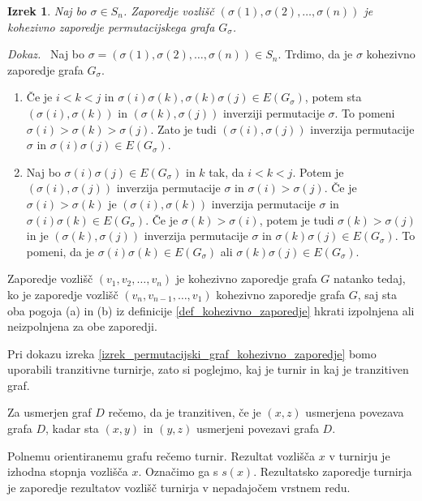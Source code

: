 \documentclass[a4paper, 12pt]{book}
\newtheorem{izrek}{Izrek}[chapter]
\newenvironment{dokaz}{\emph{Dokaz.}\ }{\hspace{\fill}{$\Box$}}
\begin{document}
\begin{izrek}
\label{izrek_sigma_kohezivno_zaporedje}
    Naj bo $\sigma \in S_n$. Zaporedje vozlišč $(\sigma(1), \sigma(2), \dots, \sigma(n))$ je kohezivno zaporedje permutacijskega grafa $G_{\sigma}$.
\end{izrek}
\begin{dokaz}
    Naj bo $\sigma = (\sigma(1), \sigma(2), \dots, \sigma(n)) \in S_n$. Trdimo, da je $\sigma$ kohezivno zaporedje grafa $G_{\sigma}$. 
    \begin{enumerate}[label=(\alph*)]
        \item Če je $i < k < j$ in $\sigma(i)\sigma(k), \sigma(k)\sigma(j) \in E(G_{\sigma})$, potem sta $(\sigma(i),\sigma(k))$ in $(\sigma(k),\sigma(j))$ inverziji permutacije $\sigma$. To pomeni $\sigma(i) > \sigma(k) > \sigma(j)$. Zato je tudi $(\sigma(i),\sigma(j))$ inverzija permutacije $\sigma$ in $\sigma(i)\sigma(j) \in E(G_{\sigma})$.        

        \item Naj bo $\sigma(i)\sigma(j) \in E(G_{\sigma})$ in $k$ tak, da $i < k < j$. Potem je $(\sigma(i),\sigma(j))$ inverzija permutacije $\sigma$ in $\sigma(i) > \sigma(j)$. Če je $\sigma(i) > \sigma(k)$ je $(\sigma(i),\sigma(k))$ inverzija permutacije $\sigma$ in $\sigma(i)\sigma(k) \in E(G_{\sigma})$. Če je $\sigma(k) > \sigma(i)$, potem je tudi $\sigma(k) > \sigma(j)$ in je $(\sigma(k), \sigma(j))$ inverzija permutacije $\sigma$ in $\sigma(k)\sigma(j) \in E(G_{\sigma})$. To pomeni, da je 
        $\sigma(i)\sigma(k) \in E(G_{\sigma})$ ali $\sigma(k)\sigma(j) \in E(G_{\sigma})$.
    \end{enumerate}
\end{dokaz}

Zaporedje vozlišč $(v_1, v_2, \dots, v_n)$ je kohezivno zaporedje grafa $G$ natanko tedaj, ko je zaporedje vozlišč $(v_n, v_{n-1}, \dots, v_1)$ kohezivno zaporedje grafa $G$, saj sta oba pogoja (a) in (b) iz definicije \ref{def_kohezivno_zaporedje} hkrati izpolnjena ali neizpolnjena za obe zaporedji.

Pri dokazu izreka \ref{izrek_permutacijski_graf_kohezivno_zaporedje} bomo uporabili tranzitivne turnirje, zato si poglejmo, kaj je turnir in kaj je tranzitiven graf.

Za usmerjen graf $D$ rečemo, da je tranzitiven, če je $(x, z)$ usmerjena povezava grafa $D$, kadar sta $(x, y)$ in $(y, z)$ usmerjeni povezavi grafa $D$. 

Polnemu orientiranemu grafu rečemo turnir. Rezultat vozlišča $x$ v turnirju je izhodna stopnja vozlišča $x$. Označimo ga s $s(x)$. Rezultatsko zaporedje turnirja je zaporedje rezultatov vozlišč turnirja v nepadajočem vrstnem redu.
\end{document}
